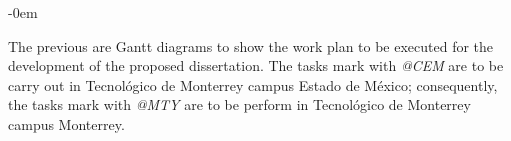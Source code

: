 \begin{gantt}{11}{12}
\begin{ganttitle}
\end{ganttitle}

\begin{ganttitle}
\end{ganttitle}



\end{gantt}

\leftskip-0em
\newpage 

The previous are Gantt diagrams to show the work plan to be executed for the development of the proposed dissertation. The tasks mark with \emph{@CEM} are to be carry out in Tecnológico de Monterrey campus Estado de México; consequently, the tasks mark with \emph{@MTY} are to be perform in Tecnológico de Monterrey campus Monterrey.







